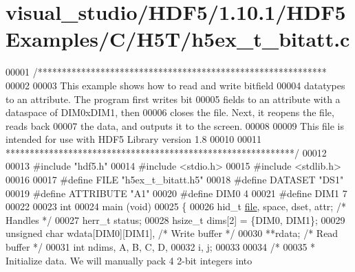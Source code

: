 \hypertarget{visual__studio_2_h_d_f5_21_810_81_2_h_d_f5_examples_2_c_2_h5_t_2h5ex__t__bitatt_8c_source}{}\section{visual\+\_\+studio/\+H\+D\+F5/1.10.1/\+H\+D\+F5\+Examples/\+C/\+H5\+T/h5ex\+\_\+t\+\_\+bitatt.c}
\label{visual__studio_2_h_d_f5_21_810_81_2_h_d_f5_examples_2_c_2_h5_t_2h5ex__t__bitatt_8c_source}

\begin{DoxyCode}
00001 \textcolor{comment}{/************************************************************}
00002 \textcolor{comment}{}
00003 \textcolor{comment}{  This example shows how to read and write bitfield}
00004 \textcolor{comment}{  datatypes to an attribute.  The program first writes bit}
00005 \textcolor{comment}{  fields to an attribute with a dataspace of DIM0xDIM1, then}
00006 \textcolor{comment}{  closes the file.  Next, it reopens the file, reads back}
00007 \textcolor{comment}{  the data, and outputs it to the screen.}
00008 \textcolor{comment}{}
00009 \textcolor{comment}{  This file is intended for use with HDF5 Library version 1.8}
00010 \textcolor{comment}{}
00011 \textcolor{comment}{ ************************************************************/}
00012 
00013 \textcolor{preprocessor}{#include "hdf5.h"}
00014 \textcolor{preprocessor}{#include <stdio.h>}
00015 \textcolor{preprocessor}{#include <stdlib.h>}
00016 
00017 \textcolor{preprocessor}{#define FILE            "h5ex\_t\_bitatt.h5"}
00018 \textcolor{preprocessor}{#define DATASET         "DS1"}
00019 \textcolor{preprocessor}{#define ATTRIBUTE       "A1"}
00020 \textcolor{preprocessor}{#define DIM0            4}
00021 \textcolor{preprocessor}{#define DIM1            7}
00022 
00023 \textcolor{keywordtype}{int}
00024 main (\textcolor{keywordtype}{void})
00025 \{
00026     hid\_t           \hyperlink{structfile}{file}, space, dset, attr;    \textcolor{comment}{/* Handles */}
00027     herr\_t          status;
00028     hsize\_t         dims[2] = \{DIM0, DIM1\};
00029     \textcolor{keywordtype}{unsigned} \textcolor{keywordtype}{char}   wdata[DIM0][DIM1],          \textcolor{comment}{/* Write buffer */}
00030                     **rdata;                    \textcolor{comment}{/* Read buffer */}
00031     \textcolor{keywordtype}{int}             ndims, A, B, C, D,
00032                     i, j;
00033 
00034     \textcolor{comment}{/*}
00035 \textcolor{comment}{     * Initialize data.  We will manually pack 4 2-bit integers into}

\end{DoxyCode}
